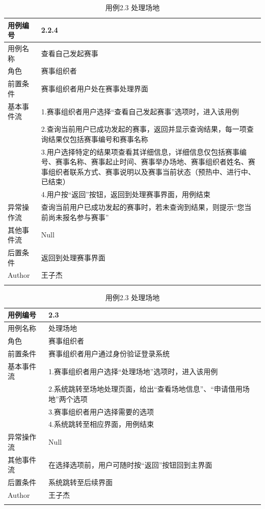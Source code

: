 \documentclass[a4paper,UTF8]{article}
\begin{document}
\begin{table}[H]
	\begin{center}
		\caption{用例2.2.4 查看自己发起赛事}
		\label{table:Tab_uc224}
		\begin{tabular}{|p{}|p{}|}
			\hline\noalign{\smallskip}
			用例编号 & 2.2.4\\
			\hline
			用例名称 & 查看自己发起赛事\\
			\hline
			角色 & 赛事组织者\\
			\hline
			前置条件 & 赛事组织者用户处在赛事处理界面\\
			\hline
			基本事件流 & 1.赛事组织者用户选择“查看自己发起赛事”选项时，进入该用例 \\& 2.查询当前用户已成功发起的赛事，返回并显示查询结果，每一项查询结果仅包括赛事编号和赛事名称 \\& 3.用户选择特定的结果项查看其详细信息，详细信息仅包括赛事编号、赛事名称、赛事起止时间、赛事举办场地、赛事组织者姓名、赛事组织者联系方式、赛事说明以及赛事当前状态（预热中、进行中、已结束）\\& 4.用户按“返回”按钮，返回到处理赛事界面，用例结束\\
			\hline
			异常操作流 & 查询当前用户已成功发起的赛事时，若未查询到结果，则提示“您当前尚未报名参与赛事”  \\
			\hline
			其他事件流 & Null\\
			\hline
			后置条件 & 返回到处理赛事界面\\
			\hline
			Author & 王子杰 \\
			\noalign{\smallskip}
			\hline
			\noalign{\smallskip}
		\end{tabular}
		\caption{用例2.3 处理场地}
		\label{table:Tab_uc23}
		\begin{tabular}{|p{}|p{}|}
			\hline\noalign{\smallskip}
			用例编号 & 2.3\\
			\hline
			用例名称 &  处理场地\\
			\hline
			角色 & 赛事组织者\\
			\hline
			前置条件 & 赛事组织者用户通过身份验证登录系统 \\
			\hline
			基本事件流 & 1.赛事组织者用户选择“处理场地”选项时，进入该用例 \\& 2.系统跳转至场地处理页面，给出“查看场地信息”、“申请借用场地”两个选项 \\& 3.赛事组织者用户选择需要的选项 \\& 4.系统跳转至相应界面，用例结束\\
			\hline
			异常操作流 & Null \\
			\hline
			其他事件流 & 在选择选项前，用户可随时按“返回”按钮回到主界面 \\
			\hline
			后置条件 & 系统跳转至后续界面 \\
			\hline
			Author & 王子杰 \\
			\noalign{\smallskip}
			\hline
			\noalign{\smallskip}
		\end{tabular}
	\end{center}
\end{table}
\end{document}
